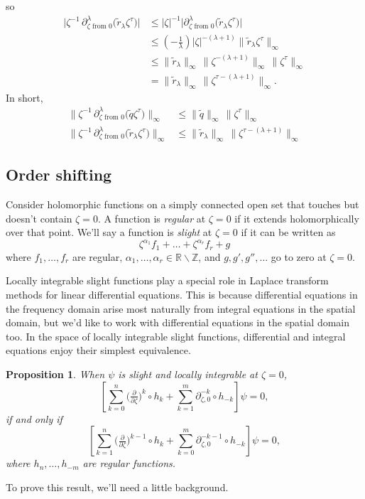 \documentclass{article}
\theoremstyle{plain}
\newtheorem{prop}{Proposition}
\newcommand{\Z}{\mathbb{Z}}
\newcommand{\R}{\mathbb{R}}
\newcommand{\fracderiv}[3]{\partial^{#1}_{#2, #3}}
\begin{document}
so
\begin{align*}
\big|\zeta^{-1}\,\partial^\lambda_{\zeta \text{ from } 0}\big(\tilde{r}_\lambda \zeta^\tau\big)\big| & \le |\zeta|^{-1} \big|\partial^\lambda_{\zeta \text{ from } 0}\big(\tilde{r}_\lambda \zeta^\tau\big)\big| \\
& \le (-\tfrac{1}{\lambda}) |\zeta|^{-(\lambda+1)} \big\|\tilde{r}_\lambda \zeta^\tau\big\|_\infty \\
& \le \|\tilde{r}_\lambda\|_\infty\,\big\|\zeta^{-(\lambda+1)}\big\|_\infty\,\big\|\zeta^\tau\big\|_\infty \\
& = \|\tilde{r}_\lambda\|_\infty\,\big\|\zeta^{\tau-(\lambda+1)}\big\|_\infty.
\end{align*}
In short,
\begin{align*}
\big\|\zeta^{-1}\,\partial^\lambda_{\zeta \text{ from } 0}\big(\tilde{q} \zeta^\tau\big)\big\|_\infty & \le \|\tilde{q}\|_\infty\,\big\|\zeta^\tau\big\|_\infty \\
\big\|\zeta^{-1}\,\partial^\lambda_{\zeta \text{ from } 0}\big(\tilde{r}_\lambda \zeta^\tau\big)\big\|_\infty & \le \|\tilde{r}_\lambda\|_\infty\,\big\|\zeta^{\tau-(\lambda+1)}\big\|_\infty
\end{align*}
\color{black}
\subsection{Order shifting}\label{shifting}
Consider holomorphic functions on a simply connected open set that touches but doesn't contain $\zeta = 0$. A function is {\em regular} at $\zeta = 0$ if it extends holomorphically over that point. We'll say a function is {\em slight} at $\zeta = 0$ if it can be written as
\begin{equation}\label{eqn:slight-defn}
\zeta^{\alpha_1} f_1 + \ldots + \zeta^{\alpha_r} f_r + g
\end{equation}
where $f_1, \ldots, f_r$ are regular, $\alpha_1, \ldots, \alpha_r \in \R \smallsetminus \Z$, and $g, g', g'', \ldots$ go to zero at $\zeta = 0$.

Locally integrable slight functions play a special role in Laplace transform methods for linear differential equations. This is because differential equations in the frequency domain arise most naturally from integral equations in the spatial domain, but we'd like to work with differential equations in the spatial domain too. In the space of locally integrable slight functions, differential and integral equations enjoy their simplest equivalence.
\begin{prop}\label{prop:shifting}
When $\psi$ is slight and locally integrable at $\zeta = 0$,
\[ \left[ \sum_{k = 0}^n \big(\tfrac{\partial}{\partial \zeta}\big)^k \circ h_k + \sum_{k = 1}^m \fracderiv{-k}{\zeta}{0} \circ h_{-k} \right] \psi = 0, \]
if and only if
\[ \left[ \sum_{k = 1}^n \big(\tfrac{\partial}{\partial \zeta}\big)^{k-1} \circ h_k + \sum_{k = 0}^m \fracderiv{-k-1}{\zeta}{0} \circ h_{-k} \right] \psi = 0, \]
where $h_n, \ldots, h_{-m}$ are regular functions.
\end{prop}
To prove this result, we'll need a little background.
\end{document}
